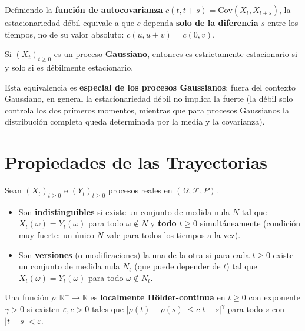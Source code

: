 \begin{observacion}
Definiendo la \textbf{función de autocovarianza} $c(t,t+s)=\text{Cov}(X_t,X_{t+s})$, la estacionariedad débil equivale a que $c$ dependa \textbf{solo de la diferencia} $s$ entre los tiempos, no de su valor absoluto: $c(u,u+v)=c(0,v)$.
\end{observacion}

\begin{teo}
Si $(X_t)_{t\ge0}$ es un proceso \textbf{Gaussiano}, entonces es estrictamente estacionario si y solo si es débilmente estacionario.
\end{teo}
\begin{observacion}
Esta equivalencia es \textbf{especial de los procesos Gaussianos}: fuera del contexto Gaussiano, en general la estacionariedad débil no implica la fuerte (la débil solo controla los dos primeros momentos, mientras que para procesos Gaussianos la distribución completa queda determinada por la media y la covarianza).
\end{observacion}

\section{Propiedades de las Trayectorias}

\begin{definicion}
Sean $(X_t)_{t\ge0}$ e $(Y_t)_{t\ge0}$ procesos reales en $(\Omega,\mathcal{F},P)$.
\begin{itemize}
    \item Son \textbf{indistinguibles} si existe un conjunto de medida nula $N$ tal que $X_t(\omega)=Y_t(\omega)$ para todo $\omega\notin N$ y \textbf{todo} $t\ge0$ simultáneamente (condición muy fuerte: un único $N$ vale para todos los tiempos a la vez).
    \item Son \textbf{versiones} (o modificaciones) la una de la otra si para cada $t\ge0$ existe un conjunto de medida nula $N_t$ (que puede depender de $t$) tal que $X_t(\omega)=Y_t(\omega)$ para todo $\omega\notin N_t$.
\end{itemize}
\end{definicion}

\begin{definicion}
Una función $\rho:\mathbb{R}^+\to\mathbb{R}$ es \textbf{localmente Hölder-continua} en $t\ge0$ con exponente $\gamma>0$ si existen $\varepsilon,c>0$ tales que $|\rho(t)-\rho(s)|\le c|t-s|^\gamma$ para todo $s$ con $|t-s|<\varepsilon$.
\end{definicion}

